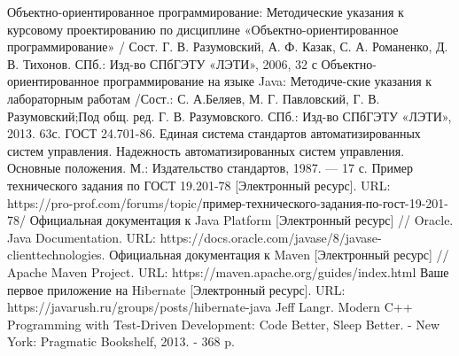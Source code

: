 
\begingroup
\renewcommand{\section}[2]{\anonsection{Список использованных источников}}
\begin{thebibliography}{00}

    Объектно-ориентированное программирование: Методические указания к  курсовому
    проектированию  по  дисциплине  «Объектно-ориентированное программирование» /
    Сост. Г. В. Разумовский, А. Ф. Казак, С. А. Романенко, Д. В. Тихонов. СПб.:
    Изд-во СПбГЭТУ «ЛЭТИ», 2006, 32 с
    Объектно-ориентированное  программирование  на  языке Java:  Методиче-ские
    указания к лабораторным работам /Сост.: С. А.Беляев, М. Г. Павловский, Г.
    В. Разумовский;Под общ. ред. Г. В. Разумовского. СПб.: Изд-во СПбГЭТУ
    «ЛЭТИ», 2013. 63с.
    ГОСТ 24.701-86. Единая система стандартов автоматизированных систем управления.
    Надежность автоматизированных систем управления. Основные положения. М.:
    Издательство стандартов, 1987. — 17 с.
    Пример технического задания по ГОСТ 19.201-78 [Электронный ресурс]. URL:
    https://pro-prof.com/forums/topic/пример-технического-задания-по-гост-19-201-78/
    Официальная документация к Java Platform [Электронный ресурс] // Oracle.
    Java Documentation. URL: https://docs.oracle.com/javase/8/javase-clienttechnologies.
    Официальная документация к Maven [Электронный ресурс] // Apache Maven Project.
    URL: https://maven.apache.org/guides/index.html
    Ваше первое приложение на Hibernate [Электронный ресурс]. URL:
    https://javarush.ru/groups/posts/hibernate-java
    Jeff Langr. Modern C++ Programming with Test-Driven Development: Code
    Better, Sleep Better. - New York: Pragmatic Bookshelf, 2013. - 368 p.

\end{thebibliography}
\endgroup

\clearpage

